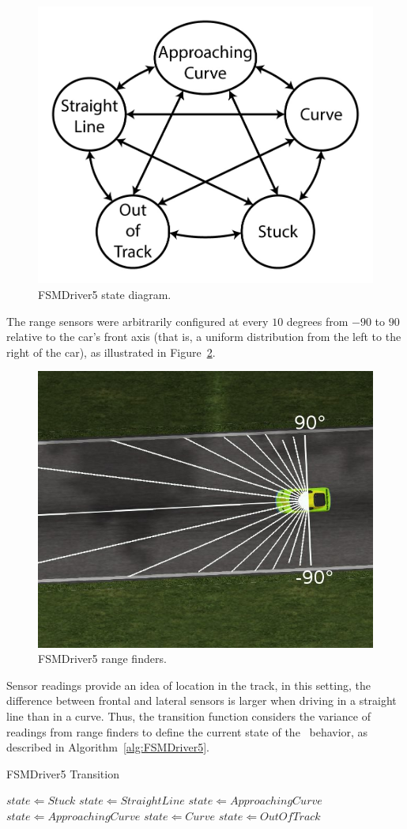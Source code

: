 \begin{figure}[h]
	\centering
	\includegraphics[width=.45\textwidth]{img/FiveStateFSM}
	\caption{FSMDriver5 state diagram.}
	\label{Fig:FSM5Diagram}
\end{figure}

The range sensors were arbitrarily configured at every $10$ degrees from $-90$ to $90$ relative to the car's front axis (that is, a uniform distribution from the left to the right of the car), as illustrated in Figure~\ref{Fig:FSM5Sensors}.

\begin{figure}[h]
	\centering
	\includegraphics[width=.45\textwidth]{img/FSM5Sensors}
	\caption{FSMDriver5 range finders.}
	\label{Fig:FSM5Sensors}
\end{figure}

Sensor readings provide an idea of location in the track, in this setting, the difference between frontal and lateral sensors is larger when driving in a straight line than in a curve. Thus, the transition function considers the variance of readings from range finders to define the current state of the \racing~behavior, as described in Algorithm~\ref{alg:FSMDriver5}.

\begin{algorithm}[h]%
\caption{FSMDriver5 Transition}%
\label{alg:FSMDriver5}%
\begin{algorithmic}
        \STATE $state \Leftarrow Stuck$
    \ELSE
			\STATE $state \Leftarrow StraightLine$
			\STATE $state \Leftarrow ApproachingCurve$
			\STATE $state \Leftarrow ApproachingCurve$
			\STATE $state \Leftarrow Curve$
		\ELSE
			\STATE $state \Leftarrow Out Of Track$
		\ENDIF
	\ENDIF
\end{algorithmic}
\end{algorithm}

